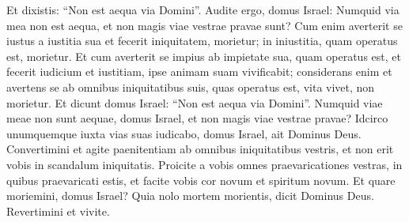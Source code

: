 \begin{biblechapter}
\begin{biblechapter}
\begin{biblechapter}
\begin{biblechapter}
\begin{biblechapter}
\begin{biblechapter}
\begin{biblechapter}
\begin{biblechapter}
\begin{biblechapter}
\begin{biblechapter}
\begin{biblechapter}
\begin{biblechapter}
\begin{biblechapter}
\begin{biblechapter}
\begin{biblechapter}
\begin{biblechapter}
\begin{biblechapter}
\begin{biblechapter}
\verse Et dixistis: “Non est aequa via Domini”. Audite ergo, domus Israel: Numquid via mea non est aequa, et non magis viae vestrae pravae sunt? 
\verse Cum enim averterit se iustus a iustitia sua et fecerit iniquitatem, morietur; in iniustitia, quam operatus est, morietur. 
\verse Et cum averterit se impius ab impietate sua, quam operatus est, et fecerit iudicium et iustitiam, ipse animam suam vivificabit; 
 \verse considerans enim et avertens se ab omnibus iniquitatibus suis, quas operatus est, vita vivet, non morietur. 
\verse Et dicunt domus Israel: “Non est aequa via Domini”. Numquid viae meae non sunt aequae, domus Israel, et non magis viae vestrae pravae?
 \verse Idcirco unumquemque iuxta vias suas iudicabo, domus Israel, ait Dominus Deus. Convertimini et agite paenitentiam ab omnibus iniquitatibus vestris, et non erit vobis in scandalum iniquitatis. 
\verse Proicite a vobis omnes praevaricationes vestras, in quibus praevaricati estis, et facite vobis cor novum et spiritum novum. Et quare moriemini, domus Israel? 
\verse Quia nolo mortem morientis, dicit Dominus Deus. Revertimini et vivite.
 

\end{biblechapter}
\end{biblechapter}
\end{biblechapter}
\end{biblechapter}
\end{biblechapter}
\end{biblechapter}
\end{biblechapter}
\end{biblechapter}
\end{biblechapter}
\end{biblechapter}
\end{biblechapter}
\end{biblechapter}
\end{biblechapter}
\end{biblechapter}
\end{biblechapter}
\end{biblechapter}
\end{biblechapter}
\end{biblechapter}
